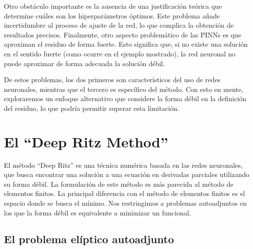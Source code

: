 \documentclass[a4paper,11pt,spanish, twoside, leqno]{tfg-uam}
\theoremstyle{definition}
\begin{document}
Otro obstáculo importante es la ausencia de una justificación teórica que determine cuáles son los hiperparámetros óptimos. Este problema añade incertidumbre al proceso de ajuste de la red, lo que complica la obtención de resultados precisos. Finalmente, otro aspecto problemático de las PINNs es que aproximan el residuo de forma fuerte. Esto significa que, si no existe una solución en el sentido fuerte (como ocurre en el ejemplo mostrado), la red neuronal no puede aproximar de forma adecuada la solución débil.

De estos problemas, los dos primeros son característicos del uso de redes neuronales, mientras que el tercero es específico del método. Con esto en mente, exploraremos un enfoque alternativo que considere la forma débil en la definición del residuo, lo que podría permitir superar esta limitación.


\section{El ``Deep Ritz Method''} \label{sec:DeepRitz}

El método ``Deep Ritz'' es una técnica numérica basada en las redes neuronales, que busca encontrar una solución a una ecuación en derivadas parciales utilizando su forma débil. La formulación de este método es más parecida al método de elementos finitos. La principal diferencia con el método de elementos finitos es el espacio donde se busca el mínimo. Nos restringimos a problemas autoadjuntos en los que la forma débil es equivalente a minimizar un funcional.



\subsection{El problema elíptico autoadjunto}\label{sec:ProblemaAutoadjunto}
\end{document}
